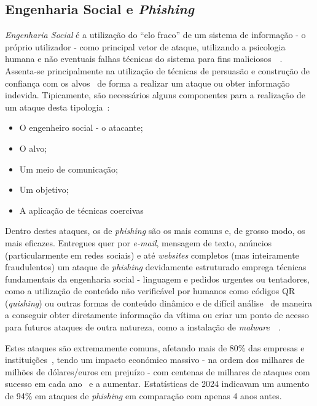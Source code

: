 \documentclass[pdflatex,sn-mathphys-num]{sn-jnl}
\theoremstyle{thmstyleone}%
\theoremstyle{thmstyletwo}%
\theoremstyle{thmstylethree}%
\begin{document}
\subsection{Engenharia Social e \textit{Phishing}}\label{subsec2.2}
\textit{Engenharia Social} é a utilização do ``elo fraco'' de um sistema de informação - o próprio utilizador - como principal vetor de ataque, utilizando a psicologia humana e não eventuais falhas técnicas do sistema para fins maliciosos~\cite{bib6}~\cite{bib7}.
Assenta-se principalmente na utilização de técnicas de persuasão e construção de confiança com os alvos~\cite{bib7} de forma a realizar um ataque ou obter informação indevida. Tipicamente, são necessários alguns componentes para a realização de um ataque desta tipologia~\cite{bib7}:
\begin{itemize}
    \item O engenheiro social - o atacante;
    \item O alvo;
    \item Um meio de comunicação;
    \item Um objetivo;
    \item A aplicação de técnicas coercivas
\end{itemize}
Dentro destes ataques, os de \textit{phishing} são os mais comuns e, de grosso modo, os mais eficazes. Entregues quer por \textit{e-mail}, mensagem de texto, anúncios (particularmente em redes sociais) e até \textit{websites} completos (mas inteiramente fraudulentos) um ataque de \textit{phishing} devidamente estruturado emprega técnicas fundamentais da engenharia social - linguagem e pedidos urgentes ou tentadores, como a utilização de conteúdo não verificável por humanos como códigos QR (\textit{quishing}) ou outras formas de conteúdo dinâmico e de difícil análise~\cite{bib1} de maneira a conseguir obter diretamente informação da vítima ou criar um ponto de acesso para futuros ataques de outra natureza, como a instalação de \textit{malware}~\cite{bib3}~\cite{bib8}.

Estes ataques são extremamente comuns, afetando mais de 80\% das empresas e instituições~\cite{bib3}, tendo um impacto económico massivo - na ordem dos milhares de milhões de dólares/euros em prejuízo - com centenas de milhares de ataques com sucesso em cada ano~\cite{bib8} e a aumentar. Estatísticas de 2024 indicavam um aumento de 94\% em ataques de \textit{phishing} em comparação com apenas 4 anos antes.
\end{document}

